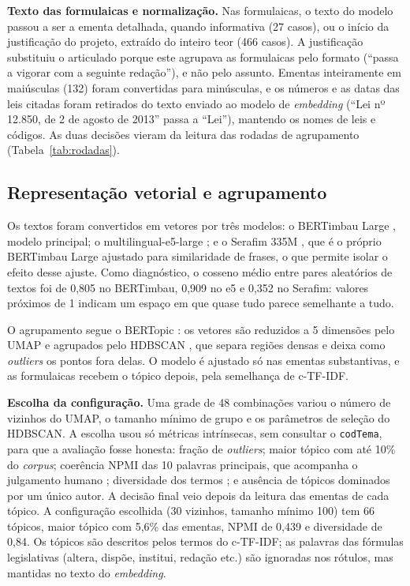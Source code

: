 \textbf{Texto das formulaicas e normalização.} Nas formulaicas, o texto do modelo passou a ser a ementa detalhada, quando informativa (27 casos), ou o início da justificação do projeto, extraído do inteiro teor (466 casos). A justificação substituiu o articulado porque este agrupava as formulaicas pelo formato (``passa a vigorar com a seguinte redação''), e não pelo assunto. Ementas inteiramente em maiúsculas (132) foram convertidas para minúsculas, e os números e as datas das leis citadas foram retirados do texto enviado ao modelo de \textit{embedding} (``Lei nº 12.850, de 2 de agosto de 2013'' passa a ``Lei''), mantendo os nomes de leis e códigos. As duas decisões vieram da leitura das rodadas de agrupamento (Tabela~\ref{tab:rodadas}).

\subsection{Representação vetorial e agrupamento}
\label{subsec:agrupamento}

Os textos foram convertidos em vetores por três modelos: o BERTimbau Large \citep{souza2020bertimbau}, modelo principal; o multilingual-e5-large \citep{wang2024multilingual}; e o Serafim 335M \citep{gomes2024serafim}, que é o próprio BERTimbau Large ajustado para similaridade de frases, o que permite isolar o efeito desse ajuste. Como diagnóstico, o cosseno médio entre pares aleatórios de textos foi de 0,805 no BERTimbau, 0,909 no e5 e 0,352 no Serafim: valores próximos de 1 indicam um espaço em que quase tudo parece semelhante a tudo.

O agrupamento segue o BERTopic \citep{grootendorst2022bertopic}: os vetores são reduzidos a 5 dimensões pelo UMAP \citep{mcinnes2018umap} e agrupados pelo HDBSCAN \citep{campello2013hdbscan}, que separa regiões densas e deixa como \textit{outliers} os pontos fora delas. O modelo é ajustado só nas ementas substantivas, e as formulaicas recebem o tópico depois, pela semelhança de c-TF-IDF.

\textbf{Escolha da configuração.} Uma grade de 48 combinações variou o número de vizinhos do UMAP, o tamanho mínimo de grupo e os parâmetros de seleção do HDBSCAN. A escolha usou só métricas intrínsecas, sem consultar o \texttt{codTema}, para que a avaliação fosse honesta: fração de \textit{outliers}; maior tópico com até 10\% do \textit{corpus}; coerência NPMI das 10 palavras principais, que acompanha o julgamento humano \citep{lau2014machine}; diversidade dos termos \citep{dieng2020topic}; e ausência de tópicos dominados por um único autor. A decisão final veio depois da leitura das ementas de cada tópico. A configuração escolhida (30 vizinhos, tamanho mínimo 100) tem 66 tópicos, maior tópico com 5,6\% das ementas, NPMI de 0,439 e diversidade de 0,84. Os tópicos são descritos pelos termos do c-TF-IDF; as palavras das fórmulas legislativas (altera, dispõe, institui, redação etc.) são ignoradas nos rótulos, mas mantidas no texto do \textit{embedding}.

